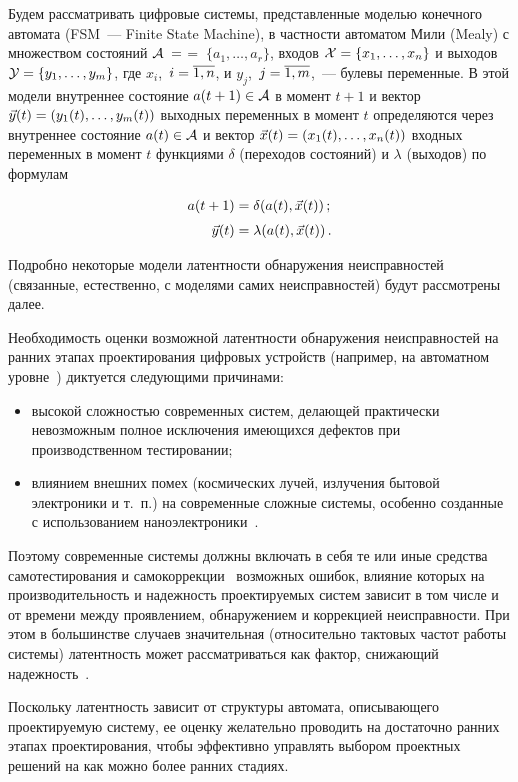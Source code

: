 \begin{multicols}{2}
 Будем рассматривать цифровые системы, представленные моделью конечного
автомата (FSM~--- Finite State Machine), в частности автоматом Мили (Mealy)
с множеством состояний ${\cal A}\;=$\linebreak $=\;\{a_1,\ldots,a_r\}$, входов
${\cal X} = \{x_1,\ldots,x_n\}$ и выходов ${\cal Y} = \{y_1,\ldots,y_m\}$,
где $x_i$,\ $i=\overline{1,n}$, и $y_j$,\ $j=\overline{1,m}$,~--- булевы переменные.
В этой модели внутреннее состояние $a(t+1)\in \cal A$ в момент $t+1$ и
вектор $\vec y(t) = (y_1(t),\ldots,y_m(t))$ выходных переменных в момент $t$
определяются через внутреннее состояние $a(t)\in \cal A$ и вектор
$\vec x(t) = (x_1(t),\ldots,x_n(t))$ входных переменных в момент $t$
функциями $\delta$ (переходов состояний) и $\lambda$ (выходов) по формулам

\noindent
\begin{align}
a(t+1) &=\delta(a(t),\vec x(t))\,;\notag\\[-6pt]
&\label{1}\\[-6pt]
\vec y(t) &=
\lambda(a(t),\vec x(t))\,.\notag
\end{align}

 Подробно некоторые модели латентности обнаружения неисправностей
(связанные,
ес\-тес\-т\-вен\-но, с моделями самих неисправностей) будут рас\-смот\-ре\-ны далее.


 Необходимость оценки возможной ла\-тент\-ности обнаружения неисправностей
на ранних этапах проектирования цифровых устройств (например, на автоматном
уровне~\cite{2}) диктуется следующими причинами:
\begin{itemize}
 \item высокой сложностью современных систем, делающей практически
невозможным полное исключения имеющихся дефектов при производственном
тестировании;
 \item влиянием внешних помех (космических лучей, излучения бытовой
электроники и т.\ п.) на современные сложные системы, особенно созданные с
использованием наноэлектроники~\cite{3}.
\end{itemize}
Поэтому современные системы должны включать в себя те или иные средства
самотестирования и самокоррекции~\cite{1} возможных ошибок, влияние которых на
производительность и надежность проектируемых систем зависит в том числе и
от времени между проявлением, обнаружением и коррекцией неисправности.
При этом в большинстве случаев значительная (относительно тактовых частот
работы системы) латентность может рассматриваться как фактор, снижающий
надежность~\cite{13, 12}.

 Поскольку латентность зависит от структуры автомата, опи\-сы\-ва\-юще\-го
проектируемую систему, ее оценку желательно проводить на достаточно ранних
этапах проектирования, чтобы эффективно управлять выбором проектных решений
на как можно более ранних стадиях.


\end{multicols}
